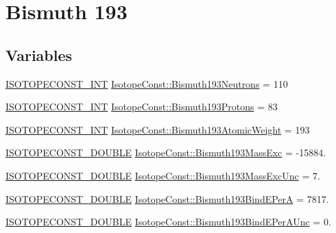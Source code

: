 \hypertarget{group___isotope_const-_bismuth-_bi193}{}\section{Bismuth 193}
\label{group___isotope_const-_bismuth-_bi193}
\subsection*{Variables}
\begin{DoxyCompactItemize}
\item 
\mbox{\hyperlink{group___isotope_const-_macros_ga5f18360b3e99483a35c32d789e62621c}{I\+S\+O\+T\+O\+P\+E\+C\+O\+N\+S\+T\+\_\+\+I\+NT}} \mbox{\hyperlink{group___isotope_const-_bismuth-_bi193_ga1965e8bb9581d7c8526c3952d6fe4f3f}{Isotope\+Const\+::\+Bismuth193\+Neutrons}} = 110
\item 
\mbox{\hyperlink{group___isotope_const-_macros_ga5f18360b3e99483a35c32d789e62621c}{I\+S\+O\+T\+O\+P\+E\+C\+O\+N\+S\+T\+\_\+\+I\+NT}} \mbox{\hyperlink{group___isotope_const-_bismuth-_bi193_ga7258e823d525a36b6b438b63c4f68c3a}{Isotope\+Const\+::\+Bismuth193\+Protons}} = 83
\item 
\mbox{\hyperlink{group___isotope_const-_macros_ga5f18360b3e99483a35c32d789e62621c}{I\+S\+O\+T\+O\+P\+E\+C\+O\+N\+S\+T\+\_\+\+I\+NT}} \mbox{\hyperlink{group___isotope_const-_bismuth-_bi193_gaf8fcc713b34b3ce078fa459092d4f247}{Isotope\+Const\+::\+Bismuth193\+Atomic\+Weight}} = 193
\item 
\mbox{\hyperlink{group___isotope_const-_macros_ga8f45a7272ce02c0b4c65c44636ed719a}{I\+S\+O\+T\+O\+P\+E\+C\+O\+N\+S\+T\+\_\+\+D\+O\+U\+B\+LE}} \mbox{\hyperlink{group___isotope_const-_bismuth-_bi193_ga62f13ad9f71bff47d9fb1cf9ab782855}{Isotope\+Const\+::\+Bismuth193\+Mass\+Exc}} = -\/15884.
\item 
\mbox{\hyperlink{group___isotope_const-_macros_ga8f45a7272ce02c0b4c65c44636ed719a}{I\+S\+O\+T\+O\+P\+E\+C\+O\+N\+S\+T\+\_\+\+D\+O\+U\+B\+LE}} \mbox{\hyperlink{group___isotope_const-_bismuth-_bi193_gaf2afa744e65cdafc8dfe07fd2b13ab64}{Isotope\+Const\+::\+Bismuth193\+Mass\+Exc\+Unc}} = 7.
\item 
\mbox{\hyperlink{group___isotope_const-_macros_ga8f45a7272ce02c0b4c65c44636ed719a}{I\+S\+O\+T\+O\+P\+E\+C\+O\+N\+S\+T\+\_\+\+D\+O\+U\+B\+LE}} \mbox{\hyperlink{group___isotope_const-_bismuth-_bi193_ga7d25c08f2ee3a941b44a67889be52f0c}{Isotope\+Const\+::\+Bismuth193\+Bind\+E\+PerA}} = 7817.
\item 
\mbox{\hyperlink{group___isotope_const-_macros_ga8f45a7272ce02c0b4c65c44636ed719a}{I\+S\+O\+T\+O\+P\+E\+C\+O\+N\+S\+T\+\_\+\+D\+O\+U\+B\+LE}} \mbox{\hyperlink{group___isotope_const-_bismuth-_bi193_gae6ab8b5d7a87cc0f5f196a7dfb241491}{Isotope\+Const\+::\+Bismuth193\+Bind\+E\+Per\+A\+Unc}} = 0.

\end{DoxyCompactItemize}
